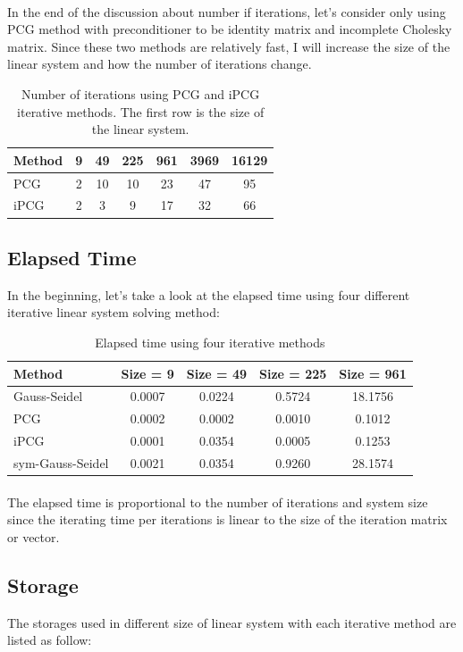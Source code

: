 \documentclass{article}
\begin{document}
\paragraph{}
In the end of the discussion about number if iterations, let's consider only using PCG method with preconditioner to be identity matrix and incomplete Cholesky matrix. Since these two methods are relatively fast, I will increase the size of the linear system and how the number of iterations change.
\begin{table}[h]
\begin{center}
\begin{tabular}{lcccccc}
\hline
Method & 9 & 49 & 225 & 961 & 3969 & 16129\\
\hline
PCG & 2 & 10 & 10 & 23 & 47 & 95\\
iPCG & 2 & 3 & 9 & 17 & 32 & 66\\
\hline
\end{tabular}
\caption{Number of iterations using PCG and iPCG iterative methods. The first row is the size of the linear system.}
\end{center}
\end{table}



\subsection{Elapsed Time}
In the beginning, let's take a look at the elapsed time using four different iterative linear system solving method:
\begin{table}[h]
\begin{center}
\begin{tabular}{lcccc}
\hline
Method & Size = 9 & Size = 49 & Size = 225 & Size = 961\\
\hline
Gauss-Seidel & 0.0007 & 0.0224 & 0.5724 & 18.1756\\
PCG & 0.0002 & 0.0002 & 0.0010 & 0.1012\\
iPCG & 0.0001 & 0.0354 & 0.0005 & 0.1253\\
sym-Gauss-Seidel & 0.0021 & 0.0354 & 0.9260 & 28.1574\\
\hline
\end{tabular}
\caption{Elapsed time using four iterative methods}
\end{center}
\end{table}
\paragraph{}
The elapsed time is proportional to the number of iterations and system size since the iterating time per iterations is linear to the size of the iteration matrix or vector.


\subsection{Storage}
The storages used in different size of linear system with each iterative method are listed as follow:


\renewcommand\refname{Reference}


\end{document}
